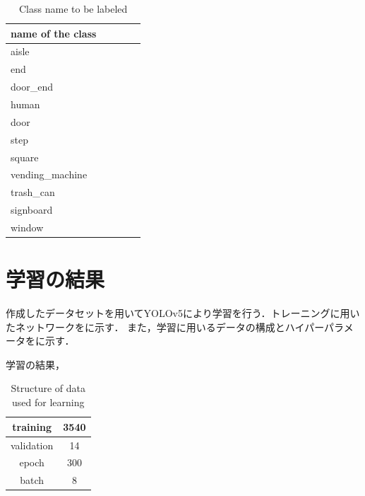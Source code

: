 \documentclass[../main]{subfiles}
\begin{document}
        \begin{table}[H]
            \caption{Class name to be labeled}
            \centering
            \label{table::datasets_table}
            \begin{tabular}{lllll}
            \hline
            name of the class &  &  &  &  \\ 
            \hline \hline
            aisle             &  &  &  &  \\
            end               &  &  &  &  \\
            door\_end         &  &  &  &  \\
            human             &  &  &  &  \\
            door              &  &  &  &  \\
            step              &  &  &  &  \\
            square            &  &  &  &  \\
            vending\_machine  &  &  &  &  \\
            trash\_can        &  &  &  &  \\
            signboard         &  &  &  &  \\
            window            &  &  &  &  \\ 
            \hline
            \end{tabular}
        \end{table}            

        \section{学習の結果}
        作成したデータセットを用いてYOLOv5により学習を行う．トレーニングに用いたネットワークをに示す．
        また，学習に用いるデータの構成とハイパーパラメータをに示す．
        

        学習の結果，

        \begin{table}[H]
            \caption{Structure of data used for learning}
            \centering
            \label{table::learning}
            \begin{tabular}{l|l}
            \hline
            \multicolumn{1}{c|}{training}   & \multicolumn{1}{c}{3540}                \\ \hline
            \multicolumn{1}{c|}{validation} & \multicolumn{1}{c}{14}                  \\ \hline
            \multicolumn{1}{c|}{epoch}      & \multicolumn{1}{c}{300}                \\ \hline
            \multicolumn{1}{c|}{batch}      & \multicolumn{1}{c}{8}                   \\ \hline
            \end{tabular}
        \end{table}
\end{document}
